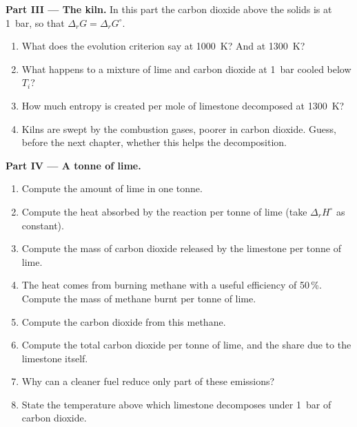 \begin{problem}
\medskip
\noindent\textbf{Part III --- The kiln.}
In this part the carbon dioxide above the solids is at \qty{1}{bar}, so
that $\Delta_r G = \Delta_r G^\circ$.
\begin{enumerate}[resume]
  \item What does the evolution criterion say at \qty{1000}{K}? And at
        \qty{1300}{K}?
  \item What happens to a mixture of lime and carbon dioxide at
        \qty{1}{bar} cooled below $T_i$?
  \item How much entropy is created per mole of limestone decomposed at
        \qty{1300}{K}?
  \item Kilns are swept by the combustion gases, poorer in carbon dioxide.
        Guess, before the next chapter, whether this helps the
        decomposition.
\end{enumerate}

\medskip
\noindent\textbf{Part IV --- A tonne of lime.}
\begin{enumerate}[resume]
  \item Compute the amount of lime in one tonne.
  \item Compute the heat absorbed by the reaction per tonne of lime
        (take $\Delta_r H^\circ$ as constant).
  \item Compute the mass of carbon dioxide released by the limestone per
        tonne of lime.
  \item The heat comes from burning methane with a useful efficiency of
        50\,\%. Compute the mass of methane burnt per tonne of lime.
  \item Compute the carbon dioxide from this methane.
  \item Compute the total carbon dioxide per tonne of lime, and the share
        due to the limestone itself.
  \item Why can a cleaner fuel reduce only part of these emissions?
  \item State the temperature above which limestone decomposes under
        \qty{1}{bar} of carbon dioxide.
\end{enumerate}
\end{problem}
